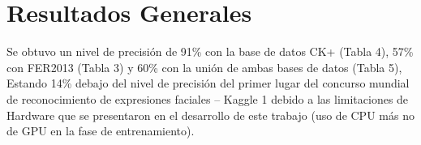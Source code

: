 \chapter*{Resultados Generales}
Se obtuvo un nivel de precisión de 91\% con la base de datos CK+ (Tabla 4), 57\%
con FER2013 (Tabla 3) y 60\% con la unión de ambas bases de datos (Tabla 5), Estando
14\% debajo del nivel de precisión del primer lugar del concurso mundial de
reconocimiento de expresiones faciales – Kaggle 1 debido a las limitaciones de Hardware
que se presentaron en el desarrollo de este trabajo (uso de CPU más no de GPU en la fase
de entrenamiento).
